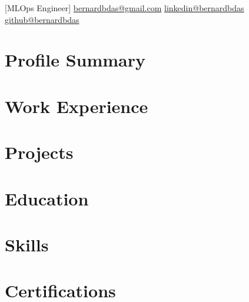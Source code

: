 \documentclass{main}
\begin{document}
[MLOps Engineer]{%
  \contactline%
  {\href{mailto:bernardbdas@gmail.com}{bernardbdas@gmail.com}}%
  {\href{https://linkedin.com/in/bernardbdas}{linkedin@bernardbdas}}%
  {\href{https://github.com/bernardbdas}{github@bernardbdas}}%
}


\begin{minipage}[t]{0.65\textwidth}

  \section{Profile Summary}
  
  \sectionsep

  \section{Work Experience}
  
  \sectionsep

  \section{Projects}
  
  \sectionsep

  \section{Education}
  

\end{minipage}%
\hfill
\begin{minipage}[t]{0.32\textwidth}

  \section{Skills}
  
  \sectionsep

  \section{Certifications}
  

\end{minipage}
\end{document}
